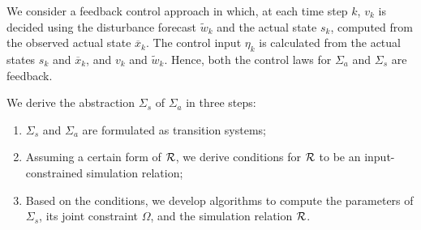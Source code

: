 
We consider a feedback control approach in which, at each time step $k$, $v_{k}$ is decided using the disturbance forecast $\tilde{w}_{k}$ and the actual state $s_{k}$, computed from the observed actual state $\overbar{x}_{k}$.
The control input $\eta_{k}$ is calculated from the actual states $s_{k}$ and $\overbar{x}_{k}$, and $v_{k}$ and $\tilde{w}_{k}$.
Hence, both the control laws for $\Sigma_{a}$ and $\Sigma_{s}$ are feedback.

We derive the abstraction $\Sigma_{s}$ of $\Sigma_{a}$ %
in three steps:
\begin{enumerate}
\item $\Sigma_{s}$ and $\Sigma_{a}$ are formulated as transition systems; %
\item Assuming a certain form of $\mathcal{R}$, we derive %
  conditions for $\mathcal{R}$ to be an input-constrained simulation relation;
\item Based on the conditions, we develop algorithms to compute the parameters of $\Sigma_{s}$, its joint constraint $\Omega$, and the simulation relation $\mathcal{R}$.
\end{enumerate}
%

